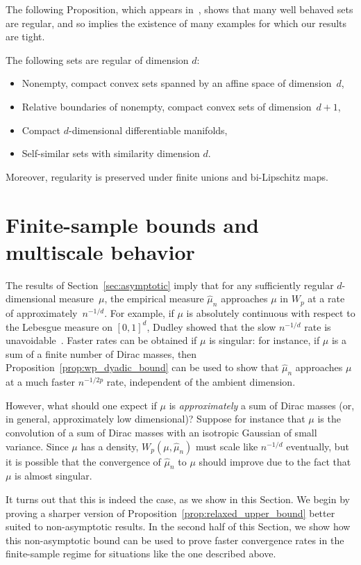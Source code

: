 \documentclass[sts]{imsart}
\begin{document}
The following Proposition, which appears in~\cite{GraLus07}, shows that many well behaved sets are regular, and so implies the existence of many examples for which our results are tight.
\begin{proposition}
The following sets are regular of dimension $d$:
\begin{itemize}
\item Nonempty, compact convex sets spanned by an affine space of dimension~$d$,
\item Relative boundaries of nonempty, compact convex sets of dimension~$d+1$,
\item Compact $d$-dimensional differentiable manifolds,
\item Self-similar sets with similarity dimension $d$.
\end{itemize}
Moreover, regularity is preserved under finite unions and bi-Lipschitz maps.
\end{proposition}

\section{Finite-sample bounds and multiscale behavior}\label{sec:finite}
The results of Section~\ref{sec:asymptotic} imply that for any sufficiently regular $d$-dimensional measure~$\mu$, the empirical measure $\hat \mu_n$ approaches $\mu$ in $W_p$ at a rate of approximately~$n^{-1/d}$.
For example, if $\mu$ is absolutely continuous with respect to the Lebesgue measure on $[0, 1]^d$, Dudley showed that the slow $n^{-1/d}$ rate is unavoidable~\cite{Dud68}.
Faster rates can be obtained if $\mu$ is singular: for instance, if $\mu$ is a sum of a finite number of Dirac masses, then Proposition~\ref{prop:wp_dyadic_bound} can be used to show that $\hat \mu_n$ approaches $\mu$ at a much faster $n^{-1/2p}$ rate, independent of the ambient dimension.

However, what should one expect if $\mu$ is \emph{approximately} a sum of Dirac masses (or, in general, approximately low dimensional)?
Suppose for instance that $\mu$ is the convolution of a sum of Dirac masses with an isotropic Gaussian of small variance.
Since $\mu$ has a density, $W_p(\mu, \hat \mu_n)$ must scale like $n^{-1/d}$ eventually, but it is possible that the convergence of $\hat \mu_n$ to $\mu$ should improve due to the fact that $\mu$ is almost singular.

It turns out that this is indeed the case, as we show in this Section.
We begin by proving a sharper version of Proposition~\ref{prop:relaxed_upper_bound} better suited to non-asymptotic results.
In the second half of this Section, we show how this non-asymptotic bound can be used to prove faster convergence rates in the finite-sample regime for situations like the one described above.
\end{document}
